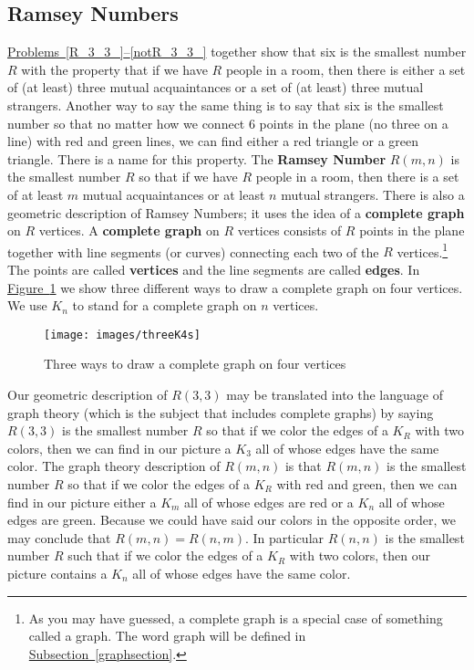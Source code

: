 \documentclass[10pt,]{book}
\newcommand{\terminology}[1]{\textbf{#1}}
\theoremstyle{plain}
\theoremstyle{definition}
\theoremstyle{definition}
\numberwithin{equation}{chapter}
\begin{document}
\subsection[{Ramsey Numbers}]{Ramsey Numbers}\label{Ramseysection}
\hypertarget{p-390}{}%
\hyperref[R_3_3_]{Problems~\ref{R_3_3_}--\ref{notR_3_3_}} together show that six is the smallest number \(R\) with the property that if we have \(R\) people in a room, then there is either a set of (at least) three mutual acquaintances or a set of (at least) three mutual strangers. Another way to say the same thing is to say that six is the smallest number so that no matter how we connect 6 points in the plane (no three on a line) with red and green lines, we can find either a red triangle or a green triangle. There is a name for this property. The \terminology{Ramsey Number} \(R(m,n)\) is the smallest number \(R\) so that if we have \(R\) people in a room, then there is a set of at least \(m\) mutual acquaintances or at least \(n\) mutual strangers. There is also a geometric description of Ramsey Numbers; it uses the idea of a \terminology{complete graph} on \(R\) vertices. A \terminology{complete graph} on \(R\) vertices consists of \(R\) points in the plane together with line segments (or curves) connecting each two of the \(R\) vertices.\footnote{As you may have guessed, a complete graph is a special case of something called a graph.  The word graph will be defined in \hyperref[graphsection]{Subsection~\ref{graphsection}}.\label{fn-4}} The points are called \terminology{vertices} and the line segments are called \terminology{edges}. In \hyperref[completegraph]{Figure~\ref{completegraph}} we show three different ways to draw a complete graph on four vertices. We use \(K_n\) to stand for a complete graph on \(n\) vertices.%
\begin{figure}
\centering
\texttt{[image: images/threeK4s]}
\caption{Three ways to draw a complete graph on four vertices\label{completegraph}}
\end{figure}
\hypertarget{p-391}{}%
Our geometric description of \(R(3,3)\) may be translated into the language of graph theory (which is the subject that includes complete graphs) by saying \(R(3,3)\) is the smallest number \(R\) so that if we color the edges of a \(K_R\) with two colors, then we can find in our picture a \(K_3\) all of whose edges have the same color.  The graph theory description of \(R(m,n)\) is that \(R(m,n)\) is the smallest number \(R\) so that if we color the edges of a \(K_R\) with red and green, then we can find in our picture either a \(K_m\) all of whose edges are red or a \(K_n\) all of whose edges are green. Because we could have said our colors in the opposite order, we may conclude that \(R(m,n) = R(n,m)\). In particular \(R(n,n)\) is the smallest number \(R\) such that if we color the edges of a \(K_R\) with two colors, then our picture contains a \(K_n\) all of whose edges have the same color.%
\end{document}
